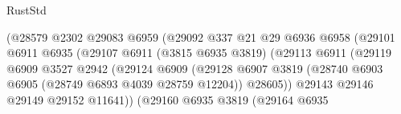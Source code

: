 \begin{lexlean}{RustStd}
\begin{coremodule}
                                              (@28579
                                                @2302
                                                @29083
                                                @6959
                                                (@29092
                                                  @337
                                                  @21
                                                  @29
                                                  @6936
                                                  @6958
                                                  (@29101
                                                    @6911
                                                    @6935
                                                    (@29107
                                                      @6911
                                                      (@3815 @6935 @3819)
                                                      (@29113
                                                        @6911
                                                        (@29119
                                                          @6909
                                                          @3527
                                                          @2942
                                                          (@29124
                                                            @6909
                                                            (@29128
                                                              @6907
                                                              @3819
                                                              (@28740
                                                                @6903
                                                                @6905
                                                                (@28749 @6893 @4039 @28759 @12204))
                                                              @28605))
                                                          @29143
                                                          @29146
                                                          @29149
                                                          @29152
                                                          @11641))
                                                      (@29160
                                                        @6935
                                                        @3819
                                                        (@29164
                                                          @6935

\end{coremodule}
\end{lexlean}

